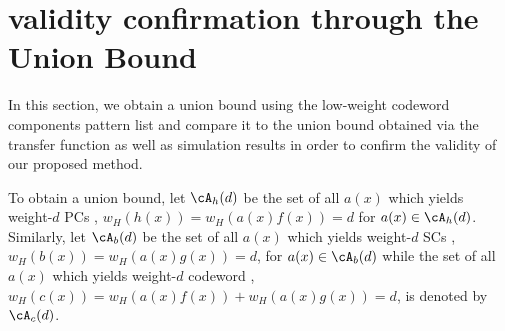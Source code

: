 \section{validity confirmation through the Union Bound}
\label{sec4}


 In this section, we obtain a union bound using the low-weight codeword components pattern list and compare it to the union bound obtained via the transfer function as well as simulation results in order to confirm the validity of our proposed method.

To obtain a union bound, let $\cA_h(d)$ be the set of all $a(x)$ which yields weight-$d$ PCs \ie, $w_H(h(x))=w_H(a(x)f(x))=d$ for $a(x) \in \cA_h(d)$. 
Similarly, let $\cA_b(d)$ be the set of all $a(x)$ which yields weight-$d$ SCs \ie, $w_H(b(x))=w_H(a(x)g(x))=d$, for $a(x) \in \cA_b(d)$
while the set of all $a(x)$ which yields weight-$d$ codeword \ie, $w_H(c(x))=w_H(a(x)f(x))+ w_H(a(x)g(x))=d$, is denoted by $\cA_c(d)$.

